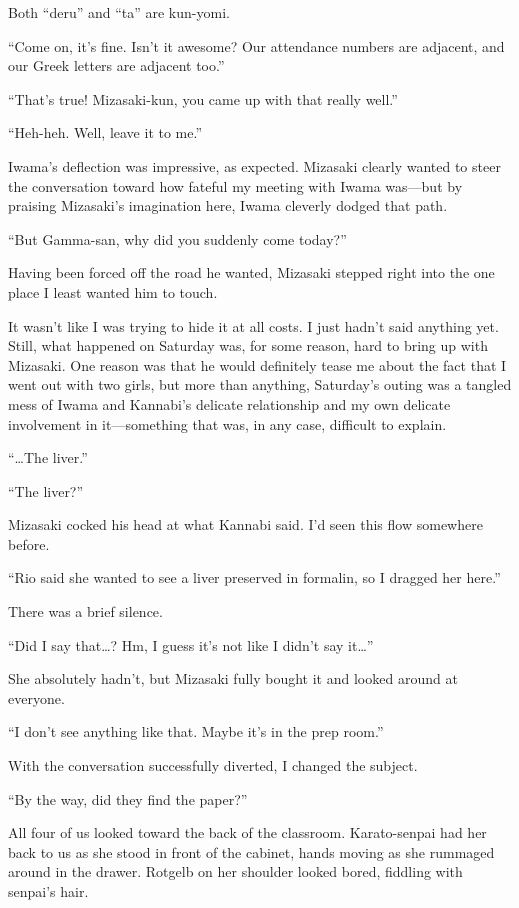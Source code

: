 \documentclass[
    a4paper,
    12pt,
    twoside,
    openany,
    UTF8,
    fontset=windows
]{ctexbook}
\begin{document}
Both ``deru'' and ``ta'' are kun-yomi.

``Come on, it's fine. Isn't it awesome? Our attendance numbers are adjacent, and our Greek letters are adjacent too.''

``That's true! Mizasaki-kun, you came up with that really well.''

``Heh-heh. Well, leave it to me.''

Iwama's deflection was impressive, as expected. Mizasaki clearly wanted to steer the conversation toward how fateful my meeting with Iwama was---but by praising Mizasaki's imagination here, Iwama cleverly dodged that path.

``But Gamma-san, why did you suddenly come today?''

Having been forced off the road he wanted, Mizasaki stepped right into the one place I least wanted him to touch.

It wasn't like I was trying to hide it at all costs. I just hadn't said anything yet. Still, what happened on Saturday was, for some reason, hard to bring up with Mizasaki. One reason was that he would definitely tease me about the fact that I went out with two girls, but more than anything, Saturday's outing was a tangled mess of Iwama and Kannabi's delicate relationship and my own delicate involvement in it---something that was, in any case, difficult to explain.

``\dots The liver.''

``The liver?''

Mizasaki cocked his head at what Kannabi said. I'd seen this flow somewhere before.

``Rio said she wanted to see a liver preserved in formalin, so I dragged her here.''

There was a brief silence.

``Did I say that\dots? Hm, I guess it's not like I didn't say it\dots''

She absolutely hadn't, but Mizasaki fully bought it and looked around at everyone.

``I don't see anything like that. Maybe it's in the prep room.''

With the conversation successfully diverted, I changed the subject.

``By the way, did they find the paper?''

All four of us looked toward the back of the classroom. Karato-senpai had her back to us as she stood in front of the cabinet, hands moving as she rummaged around in the drawer. Rotgelb on her shoulder looked bored, fiddling with senpai's hair.
\end{document}
